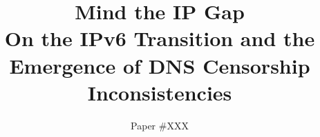 \documentclass[letterpaper,twocolumn,10pt]{article}
\begin{document}
\pagestyle{plain} %


\renewcommand{\sectionautorefname}{\S}
\renewcommand{\subsectionautorefname}{\S}
\renewcommand{\subsubsectionautorefname}{\S}
\date{}

\setlength{\droptitle}{-5em}   %
\posttitle{\par\end{center}}   %
\title{{\bf Mind the IP Gap}\\\Large{On the IPv6 Transition and the Emergence of
DNS Censorship Inconsistencies}}
\author{Paper \#XXX}


\maketitle

\begin{abstract}
 
\end{abstract}























\end{document}
